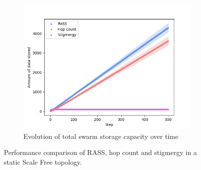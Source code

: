\documentclass[letterpaper, 10 pt, conference]{ieeeconf}
\begin{document}
\begin{figure}
\begin{subfigure}{0.30\textwidth}
        \includegraphics[width=\textwidth]{figures/scale_storage.png}
        \caption{Evolution of total swarm storage capacity over time}
        \label{results:scale_100_storage}
    \end{subfigure}
    \caption{Performance comparison of RASS, hop count and stigmergy in a static Scale Free topology.}
    \label{results:staticTopologyScale}
    \vspace{-2mm}
\end{figure}
\end{document}
